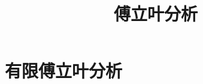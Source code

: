 \documentclass{book}
\begin{document}
\title{傅立叶分析}
\maketitle

\chapter{有限傅立叶分析}


\cite{stein2003}


\end{document}

